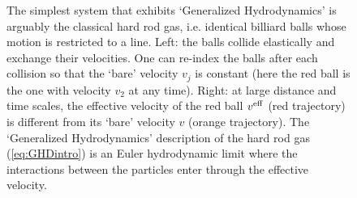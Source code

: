 \documentclass[onecolumn,amsfonts,showpacs,superscriptaddress]{revtex4-1}
\begin{document}
\begin{figure}[ht]
    \centering
    \caption{The simplest system that exhibits `Generalized Hydrodynamics' is arguably the classical hard rod gas, i.e. identical billiard balls whose motion is restricted to a line. Left: the balls collide elastically and exchange their velocities. One can re-index the balls after each collision so that the `bare' velocity $v_j$ is constant (here the red ball is the one with velocity $v_2$ at any time). Right: at large distance and time scales, the effective velocity of the red ball $v^{\rm eff}$ (red trajectory) is different from its `bare' velocity $v$ (orange trajectory). The `Generalized Hydrodynamics' description of the hard rod gas (\ref{eq:GHDintro}) is an Euler hydrodynamic limit where the interactions between the particles enter through the effective velocity.}
    \label{fig:hardrod}
\end{figure}
\end{document}

